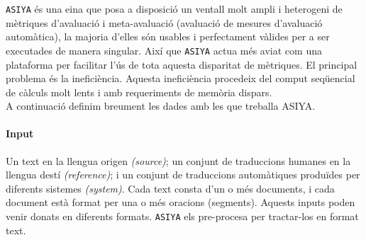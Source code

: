 \documentclass[11pt,a4paper]{article}
\begin{document}
\texttt{ASIYA} és una eina que posa a disposició un ventall molt ampli i heterogeni de mètriques d'avaluació i meta-avaluació (avaluació de mesures d'avaluació automàtica), la majoria d'elles són usables i perfectament vàlides per a ser executades de manera singular. Així que \texttt{ASIYA} actua més aviat com una plataforma per facilitar l'ús de tota aquesta disparitat de mètriques. El principal problema és la ineficiència. Aquesta ineficiència procedeix del comput seqüencial de càlculs molt lents i amb requeriments de memòria dispars.
\\

A continuació definim breument les dades amb les que treballa {ASIYA}.
\\


\paragraph{Input} Un text en la llengua origen \textit{(source)}; un conjunt de traduccions humanes en la llengua destí \textit{(reference)}; i un conjunt de traduccions automàtiques produïdes per diferents sistemes \textit{(system)}. Cada text consta d'un o més documents, i cada document està format per una o més oracions (segments). Aquests inputs poden venir donats en diferents formats. \texttt{ASIYA} els pre-procesa per tractar-los en format text.

\end{document}
